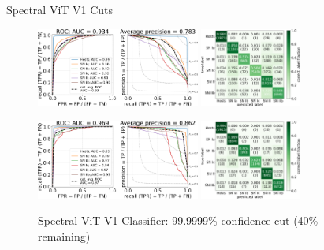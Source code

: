 \begin{frame}{Spectral ViT V1 Cuts}
    \begin{figure}[b]
        \centering
        \includegraphics[height=2.6cm]{figures/Presentation/v1/vit_model_V1_original_redoroc99_e31.png}
        \quad
        \includegraphics[height=2.6cm]{figures/Presentation/v1/vit_model_V1_original_redocm99_e31.png}
        \caption{Spectral ViT V1 Classifier: 99\% confidence cut (63.4\% remaining)\label{fig:v1_99_qual}}
        \includegraphics[height=2.6cm]{figures/Presentation/v1/vit_model_V1_original_redoroc999999_e31.png}
        \quad
        \includegraphics[height=2.6cm]{figures/Presentation/v1/vit_model_V1_original_redocm999999_e31.png}
        \caption{Spectral ViT V1 Classifier: 99.9999\% confidence cut (40\% remaining)\label{fig:v1_999999_qual}}
    \end{figure}
\end{frame}


